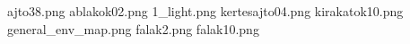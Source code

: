 ajto38.png
ablakok02.png
1_light.png
kertesajto04.png
kirakatok10.png
general_env_map.png
falak2.png
falak10.png
